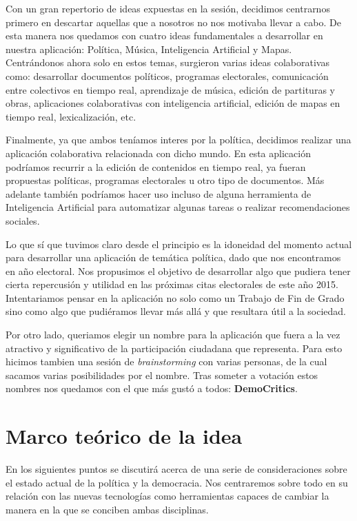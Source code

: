 Con un gran repertorio de ideas expuestas en la sesión, decidimos centrarnos primero en descartar aquellas que a nosotros no nos motivaba llevar a cabo. De esta manera nos quedamos con cuatro ideas fundamentales a desarrollar en nuestra aplicación: Política, Música, Inteligencia Artificial y Mapas. Centrándonos ahora solo en estos temas, surgieron varias ideas colaborativas como: desarrollar documentos políticos, programas electorales, comunicación entre colectivos en tiempo real, aprendizaje de música, edición de partituras y obras, aplicaciones colaborativas con inteligencia artificial, edición de mapas en tiempo real, lexicalización, etc.

Finalmente, ya que ambos teníamos interes por la política, decidimos realizar una aplicación colaborativa relacionada con dicho mundo. En esta aplicación podríamos recurrir a la edición de contenidos en tiempo real, ya fueran propuestas políticas, programas electorales u otro tipo de documentos. Más adelante también podríamos hacer uso incluso de alguna herramienta de Inteligencia Artificial para automatizar algunas tareas o realizar recomendaciones sociales.

Lo que sí que tuvimos claro desde el principio es la idoneidad del momento actual para desarrollar una aplicación de temática política, dado que nos encontramos en año electoral. Nos propusimos el objetivo de desarrollar algo que pudiera tener cierta repercusión y utilidad en las próximas citas electorales de este año 2015. Intentariamos pensar en la aplicación no solo como un Trabajo de Fin de Grado sino como algo que pudiéramos llevar más allá y que resultara útil a la sociedad.

Por otro lado, queriamos elegir un nombre para la aplicación que fuera a la vez atractivo y significativo de la participación ciudadana que representa. Para esto hicimos tambien una sesión de \textit{brainstorming} con varias personas, de la cual sacamos varias posibilidades por el nombre. Tras someter a votación estos nombres nos quedamos con el que más gustó a todos: \textbf{DemoCritics}.

\section{Marco teórico de la idea}

En los siguientes puntos se discutirá acerca de una serie de consideraciones sobre el estado actual de la política y la democracia. Nos centraremos sobre todo en su relación con las nuevas tecnologías como herramientas capaces de cambiar la manera en la que se conciben ambas disciplinas.

